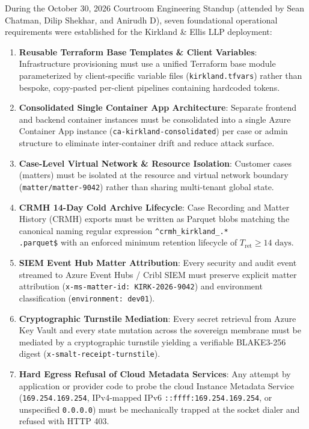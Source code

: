 \documentclass[10pt,twoside,openany]{book}
\theoremstyle{plain}
\theoremstyle{definition}
\theoremstyle{remark}
\begin{document}
During the October 30, 2026 Courtroom Engineering Standup (attended by Sean Chatman, Dilip Shekhar, and Anirudh D), seven foundational operational requirements were established for the Kirkland \& Ellis LLP deployment:
\begin{enumerate}[label=\textbf{REQ-\arabic*:}]
    \item \textbf{Reusable Terraform Base Templates \& Client Variables}: Infrastructure provisioning must use a unified Terraform base module parameterized by client-specific variable files (\texttt{kirkland.tfvars}) rather than bespoke, copy-pasted per-client pipelines containing hardcoded tokens.
    \item \textbf{Consolidated Single Container App Architecture}: Separate frontend and backend container instances must be consolidated into a single Azure Container App instance (\texttt{ca-kirkland-consolidated}) per case or admin structure to eliminate inter-container drift and reduce attack surface.
    \item \textbf{Case-Level Virtual Network \& Resource Isolation}: Customer cases (matters) must be isolated at the resource and virtual network boundary (\texttt{matter/matter-9042}) rather than sharing multi-tenant global state.
    \item \textbf{CRMH 14-Day Cold Archive Lifecycle}: Case Recording and Matter History (CRMH) exports must be written as Parquet blobs matching the canonical naming regular expression \texttt{\^{}crmh\_kirkland\_.*\\.parquet\$} with an enforced minimum retention lifecycle of $T_{\mathrm{ret}} \ge 14\text{ days}$.
    \item \textbf{SIEM Event Hub Matter Attribution}: Every security and audit event streamed to Azure Event Hubs / Cribl SIEM must preserve explicit matter attribution (\texttt{x-ms-matter-id: KIRK-2026-9042}) and environment classification (\texttt{environment: dev01}).
    \item \textbf{Cryptographic Turnstile Mediation}: Every secret retrieval from Azure Key Vault and every state mutation across the sovereign membrane must be mediated by a cryptographic turnstile yielding a verifiable BLAKE3-256 digest (\texttt{x-smalt-receipt-turnstile}).
    \item \textbf{Hard Egress Refusal of Cloud Metadata Services}: Any attempt by application or provider code to probe the cloud Instance Metadata Service (\texttt{169.254.169.254}, IPv4-mapped IPv6 \texttt{::ffff:169.254.169.254}, or unspecified \texttt{0.0.0.0}) must be mechanically trapped at the socket dialer and refused with HTTP 403.
\end{enumerate}
\end{document}
